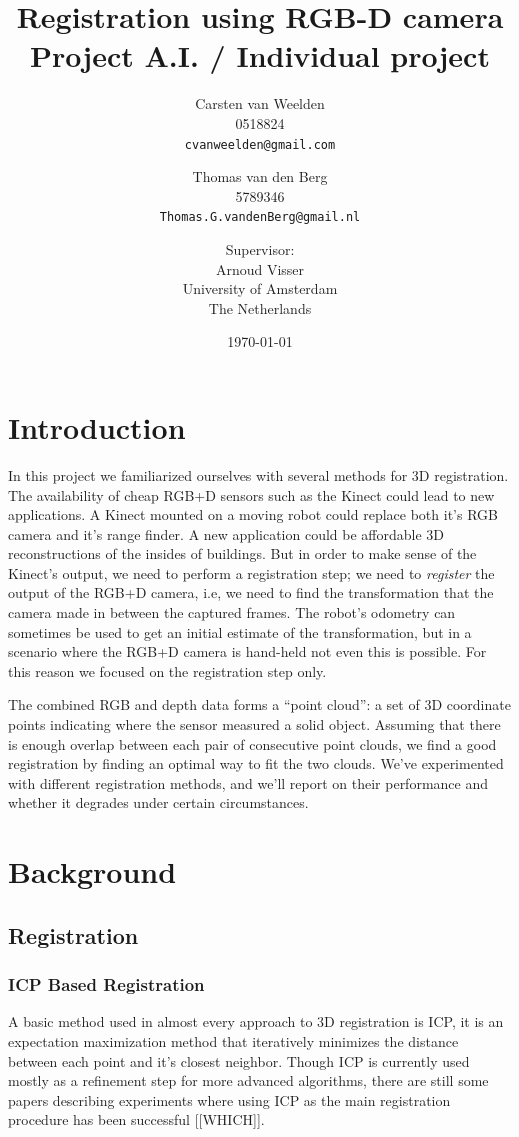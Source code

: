 \documentclass[a4paper]{article}
\title{Registration using RGB-D camera\\
{\large Project A.I. / Individual project}}
\author{Carsten van Weelden \\ 0518824 \\ \texttt{cvanweelden@gmail.com} \and Thomas van den Berg \\ 5789346 \\ \texttt{Thomas.G.vandenBerg@gmail.nl} \and
 \small{Supervisor:} \\ Arnoud Visser \\ University of Amsterdam\\
  The Netherlands}
\date{\today}
\begin{document}
\maketitle



\section{Introduction}

In this project we familiarized ourselves with several methods for 3D registration. The availability of cheap RGB+D sensors such as the Kinect could lead to new applications. A Kinect mounted on a moving robot could replace both it's RGB camera and it's range finder. A new application could be affordable 3D reconstructions of the insides of buildings. But in order to make sense of the Kinect's output, we need to perform a registration step; we need to \emph{register} the output of the RGB+D camera, i.e, we need to find the transformation that the camera made in between the captured frames. The robot's odometry can sometimes be used to get an initial estimate of the transformation, but in a scenario where the RGB+D camera is hand-held not even this is possible. For this reason we focused on the registration step only. 

The combined RGB and depth data forms a ``point cloud'': a set of 3D coordinate points indicating where the sensor measured a solid object. Assuming that there is enough overlap between each pair of consecutive point clouds, we find a good registration by finding an optimal way to fit the two clouds. We've experimented with different registration methods, and we'll report on their performance and whether it degrades under certain circumstances.

\section{Background}

\subsection{Registration}

\subsubsection{ICP Based Registration}

A basic method used in almost every approach to 3D registration is \ac{ICP}\cite{besl1992method}, it is an expectation maximization method that iteratively minimizes the distance between each point and it's closest neighbor. Though \ac{ICP} is currently used mostly as a refinement step for more advanced algorithms, there are still some papers describing experiments where using \ac{ICP} as the main registration procedure has been successful [[WHICH]]. 
\end{document}
